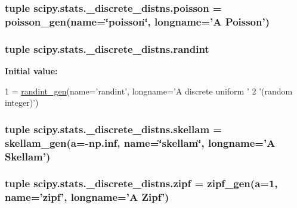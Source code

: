 \subsubsection[{poisson}]{\setlength{\rightskip}{0pt plus 5cm}tuple scipy.\+stats.\+\_\+discrete\+\_\+distns.\+poisson = {\bf poisson\+\_\+gen}(name=\char`\"{}poisson\char`\"{}, longname='{\bf A} Poisson')}\label{namespacescipy_1_1stats_1_1__discrete__distns_aee3aa8ef9c359a2799da8d13cc7660ed}
\hypertarget{namespacescipy_1_1stats_1_1__discrete__distns_a0e59b26c3770d192a6711436ec2c0ccb}{}
\subsubsection[{randint}]{\setlength{\rightskip}{0pt plus 5cm}tuple scipy.\+stats.\+\_\+discrete\+\_\+distns.\+randint}\label{namespacescipy_1_1stats_1_1__discrete__distns_a0e59b26c3770d192a6711436ec2c0ccb}
{\bfseries Initial value\+:}
\begin{DoxyCode}
1 = \hyperlink{classscipy_1_1stats_1_1__discrete__distns_1_1randint__gen}{randint\_gen}(name=\textcolor{stringliteral}{'randint'}, longname=\textcolor{stringliteral}{'A discrete uniform '}
2                       \textcolor{stringliteral}{'(random integer)'})
\end{DoxyCode}
\hypertarget{namespacescipy_1_1stats_1_1__discrete__distns_afcc9522402025c4e2da2c1b9db4a6a28}{}
\subsubsection[{skellam}]{\setlength{\rightskip}{0pt plus 5cm}tuple scipy.\+stats.\+\_\+discrete\+\_\+distns.\+skellam = {\bf skellam\+\_\+gen}({\bf a}=-\/np.\+inf, name=\char`\"{}skellam\char`\"{}, longname='{\bf A} Skellam')}\label{namespacescipy_1_1stats_1_1__discrete__distns_afcc9522402025c4e2da2c1b9db4a6a28}
\hypertarget{namespacescipy_1_1stats_1_1__discrete__distns_ac74b93ca0272496d4d0aff8000bc13a4}{}
\subsubsection[{zipf}]{\setlength{\rightskip}{0pt plus 5cm}tuple scipy.\+stats.\+\_\+discrete\+\_\+distns.\+zipf = {\bf zipf\+\_\+gen}({\bf a}=1, name='zipf', longname='{\bf A} Zipf')}\label{namespacescipy_1_1stats_1_1__discrete__distns_ac74b93ca0272496d4d0aff8000bc13a4}
